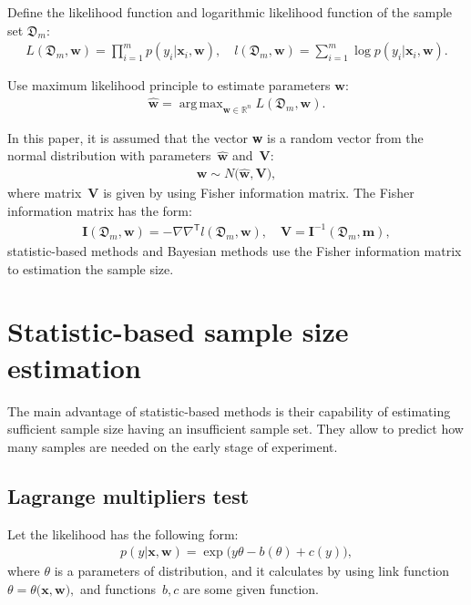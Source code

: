 \documentclass[
11pt,%
tightenlines,%
twoside,%
onecolumn,%
nofloats,%
nobibnotes,%
nofootinbib,%
superscriptaddress,%
noshowpacs,%
centertags]%
{revtex4}
\DeclareMathOperator*{\argmax}{arg\,max}
\begin{document}
Define the likelihood function and logarithmic likelihood function of the sample set $\mathfrak{D}_{m}$:
\[
\label{eq:ps:4}
\begin{aligned}
	L\left(\mathfrak{D}_{m}, \textbf{w}\right) = \prod_{i=1}^{m} p\left(y_{i}|\textbf{x}_{i}, \textbf{w}\right),\quad l\left(\mathfrak{D}_{m}, \textbf{w}\right) = \sum_{i=1}^{m} \log p\left(y_i|\textbf{x}_{i}, \textbf{w}\right).
\end{aligned}
\]

Use maximum likelihood principle to estimate parameters $\textbf{w}$:
\[
\label{eq:ps:5}
\begin{aligned}
	\hat{\textbf{w}} = \argmax_{\textbf{w}\in\mathbb{R}^{n}}L\left(\mathfrak{D}_{m}, \textbf{w}\right).
\end{aligned}
\]

In this paper, it is assumed that the vector \textbf{w} is a random vector from the normal distribution with parameters~$\hat{\textbf{w}}$ and~$\mathbf{V}$:
\[
\label{eq:ps:5'}
\begin{aligned}
    \textbf{w} \sim N\bigr(\hat{\textbf{w}}, \mathbf{V}\bigr),
\end{aligned}
\]
where matrix~$\mathbf{V}$ is given by using Fisher information matrix. The Fisher information matrix has the form:
\[
\label{eq:ps:6}
\begin{aligned}
	\textbf{I}\left(\mathfrak{D}_{m}, \textbf{w}\right) = -\nabla\nabla^{\mathsf{T}}l\left(\mathfrak{D}_{m}, \textbf{w}\right), \quad  \textbf{V} = \textbf{I}^{-1}\left(\mathfrak{D}_{m}, \textbf{m}\right),
\end{aligned}
\]
statistic-based methods and Bayesian methods use the Fisher information matrix to estimation the sample size.

\section{Statistic-based sample size estimation}
The main advantage of statistic-based methods is their capability of estimating sufficient sample size having an insufficient sample set. They allow to predict how many samples are needed on the early stage of experiment.

\subsection{Lagrange multipliers test}
Let the likelihood has the following form:
\[
\label{eq:sb:1}
\begin{aligned}
	p(y|\mathbf{x}, \mathbf{w}) = \exp\bigl(y\theta- b(\theta) + c\left(y\right)\bigr),
\end{aligned}
\]
where $\theta$ is a parameters of distribution, and it calculates by using link function $\theta=\theta\bigr(\mathbf{x}, \mathbf{w}\bigr),$ and functions~$b, c$ are some given function.
\end{document}
